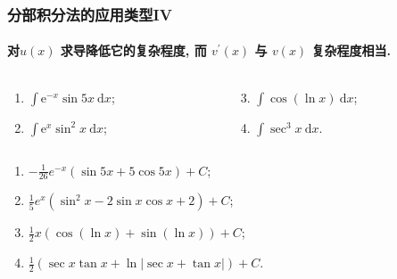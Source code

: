 \documentclass[
10pt,
aspectratio=43,
]{beamer}
\begin{document}
\begin{frame}
	\frametitle{分部积分法的应用类型IV}
	\framesubtitle{对$u(x)$ 求导降低它的复杂程度, 而 $v^{\prime}(x)$ 与 $v(x)$ 复杂程度相当. }
	\everymath{\displaystyle}
	\begin{block}{}
		\begin{columns}[onlytextwidth]
			\begin{column}{0.5\textwidth}
				\begin{enumerate}
					\item $\int \mathrm{e}^{-x} \sin 5 x \mathrm{~d} x$;
					\item $\int \mathrm{e}^x \sin ^2 x \mathrm{~d} x$;
				\end{enumerate}
			\end{column}
			\begin{column}{0.5\textwidth}
				\begin{enumerate}
					\setcounter{enumi}{2}
					\item $\int \cos (\ln x) \mathrm{~d} x$;
					\item $\int \sec ^3 x \mathrm{~d} x$.
				\end{enumerate}
			\end{column}
		\end{columns}
	\end{block}
	\begin{exampleblock}{}
		\begin{enumerate}
			\pause \item $-\frac{1}{26}e^{-x}\left(\sin 5x +5\cos 5x\right)+C$;
			      \pause \item $\frac{1}{5}e^{x}\left(\sin^2x -2\sin x\cos x+2\right)+C$;
			      \pause \item $\frac12x\left(\cos(\ln x)+\sin(\ln x)\right)+C$;
			      \pause \item $\frac{1}{2}(\sec x \tan x+\ln |\sec x+\tan x|)+C$.
		\end{enumerate}
	\end{exampleblock}
\end{frame}
\end{document}
